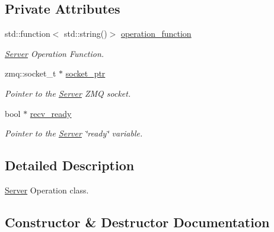 \subsection*{Private Attributes}
\begin{DoxyCompactItemize}
\item 
std\+::function$<$ std\+::string()$>$ \hyperlink{classzcm_1_1Server__Operation_a9fe0d75b858647a21323293746df6c9e}{operation\+\_\+function}
\begin{DoxyCompactList}\small\item\em \hyperlink{classzcm_1_1Server}{Server} Operation Function. \end{DoxyCompactList}\item 
zmq\+::socket\+\_\+t $\ast$ \hyperlink{classzcm_1_1Server__Operation_a07efad79c512d03a54fe2bb99166d52f}{socket\+\_\+ptr}
\begin{DoxyCompactList}\small\item\em Pointer to the \hyperlink{classzcm_1_1Server}{Server} Z\+MQ socket. \end{DoxyCompactList}\item 
bool $\ast$ \hyperlink{classzcm_1_1Server__Operation_a2b71778be842aedf6d122b531e186ca8}{recv\+\_\+ready}
\begin{DoxyCompactList}\small\item\em Pointer to the \hyperlink{classzcm_1_1Server}{Server} \char`\"{}ready\char`\"{} variable. \end{DoxyCompactList}\end{DoxyCompactItemize}


\subsection{Detailed Description}
\hyperlink{classzcm_1_1Server}{Server} Operation class. 

\subsection{Constructor \& Destructor Documentation}
